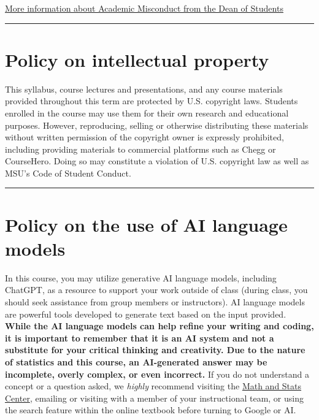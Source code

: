 \documentclass[
]{article}
\begin{document}
\href{https://www.montana.edu/deanofstudents/academicmisconduct/academicmisconduct.html}{More
information about Academic Misconduct from the Dean of Students}

\begin{center}\rule{0.5\linewidth}{0.5pt}\end{center}

\section{Policy on intellectual
property}\label{policy-on-intellectual-property}

This syllabus, course lectures and presentations, and any course
materials provided throughout this term are protected by U.S. copyright
laws. Students enrolled in the course may use them for their own
research and educational purposes. However, reproducing, selling or
otherwise distributing these materials without written permission of the
copyright owner is expressly prohibited, including providing materials
to commercial platforms such as Chegg or CourseHero. Doing so may
constitute a violation of U.S. copyright law as well as MSU's Code of
Student Conduct.

\begin{center}\rule{0.5\linewidth}{0.5pt}\end{center}

\section{Policy on the use of AI language models}\label{AI}

In this course, you may utilize generative AI language models, including
ChatGPT, as a resource to support your work outside of class (during
class, you should seek assistance from group members or instructors). AI
language models are powerful tools developed to generate text based on
the input provided. \textbf{While the AI language models can help refine
your writing and coding, it is important to remember that it is an AI
system and not a substitute for your critical thinking and creativity.
Due to the nature of statistics and this course, an AI-generated answer
may be incomplete, overly complex, or even incorrect.} If you do not
understand a concept or a question asked, we \emph{highly} recommend
visiting the \href{https://math.montana.edu/undergrad/msc/}{Math and
Stats Center}, emailing or visiting with a member of your instructional
team, or using the search feature within the online textbook before
turning to Google or AI.
\end{document}
